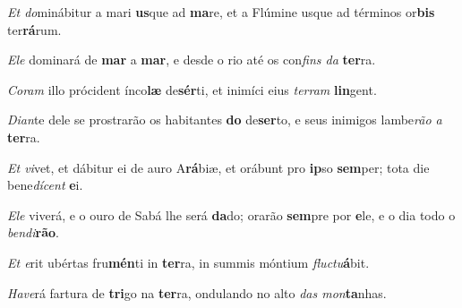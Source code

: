 \begin{greenumerate}
  \setcounter{enumi}{1}


  \item \textit{Et do}minábitur a mari \textbf{us}que ad \textbf{ma}re, {\GreStar} et a Flúmine usque ad términos or\textbf{bis} ter\textbf{rá}rum. 

  \switchcolumn\setcounter{enumi}{1}

  \item \textit{Ele} dominará de \textbf{mar} a \textbf{mar}, {\GreStar} e desde o rio até os con\textit{fins da} \textbf{ter}ra. 

  \switchcolumn*


  \item \textit{Coram} illo prócident ínco\textbf{læ} de\textbf{sér}ti, {\GreStar} et inimíci eius \textit{terram} \textbf{lin}gent. 

  \switchcolumn%

  \item \textit{Dian}te dele se prostrarão os habitantes \textbf{do} de\textbf{ser}to, {\GreStar} e seus inimigos lambe\textit{rão a}  \textbf{ter}ra. 

  \switchcolumn*


  \item \textit{Et vi}vet, et dábitur ei de auro A\textbf{rá}biæ, {\GreDagger} et orábunt pro \textbf{ip}so \textbf{sem}per; {\GreStar} tota die bene\textit{dícent} \textbf{e}i. 


  \switchcolumn%

  \item \textit{Ele} viverá, e o ouro de Sabá lhe será \textbf{da}do; {\GreDagger} orarão \textbf{sem}pre por \textbf{e}le, {\GreStar} e o dia todo o \textit{bendi}\textbf{rão}. 

  \switchcolumn*


  \item \textit{Et e}rit ubértas fru\textbf{mén}ti in \textbf{ter}ra, {\GreStar} in summis móntium \textit{fluctu}\textbf{á}bit. 

  \switchcolumn%

  \item \textit{Have}rá fartura de \textbf{tri}go na \textbf{ter}ra, {\GreStar} ondulando no alto \textit{das mon}\textbf{ta}nhas. 

\end{greenumerate}